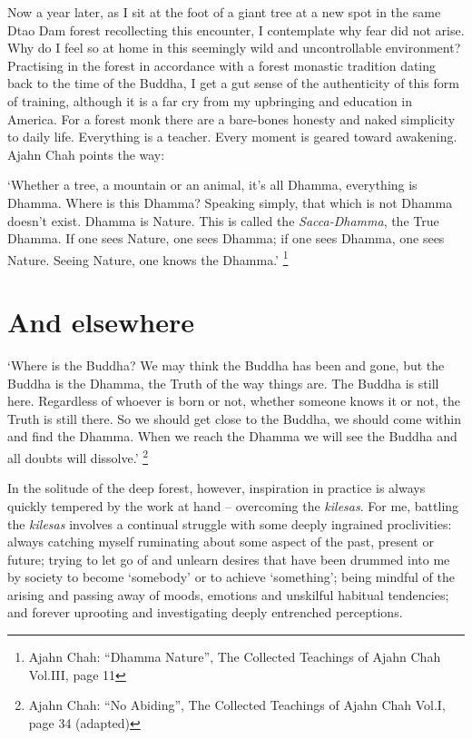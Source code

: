 Now a year later, as I sit at the foot of a giant tree at a new spot in
the same Dtao Dam forest recollecting this encounter, I contemplate why
fear did not arise. Why do I feel so at home in this seemingly wild and
uncontrollable environment? Practising in the forest in accordance with
a forest monastic tradition dating back to the time of the Buddha, I get
a gut sense of the authenticity of this form of training, although it is
a far cry from my upbringing and education in America. For a forest monk
there are a bare-bones honesty and naked simplicity to daily life. 
Everything is a teacher. Every moment is geared toward awakening. Ajahn
Chah points the way: 

`Whether a tree, a mountain or an animal, it's all Dhamma, everything is
Dhamma. Where is this Dhamma? Speaking simply, that which is not Dhamma
doesn't exist. Dhamma is Nature. This is called the \emph{Sacca-Dhamma}, 
the True Dhamma. If one sees Nature, one sees Dhamma; if one sees
Dhamma, one sees Nature. Seeing Nature, one knows the Dhamma.'%
\footnote{Ajahn Chah: ``Dhamma Nature'', The Collected Teachings of Ajahn Chah Vol.III, page 11}

\section{And elsewhere}

`Where is the Buddha? We may think the Buddha has been and gone, but the
Buddha is the Dhamma, the Truth of the way things are. The Buddha is
still here. Regardless of whoever is born or not, whether someone knows
it or not, the Truth is still there. So we should get close to the
Buddha, we should come within and find the Dhamma. When we reach the
Dhamma we will see the Buddha and all doubts will dissolve.'%
\footnote{Ajahn Chah: ``No Abiding'', The Collected Teachings of Ajahn Chah Vol.I, page 34 (adapted)}

In the solitude of the deep forest, however, inspiration in practice is
always quickly tempered by the work at hand -- overcoming the
\emph{kilesas}. For me, battling the \emph{kilesas} involves a continual
struggle with some deeply ingrained proclivities: always catching myself
ruminating about some aspect of the past, present or future; trying to
let go of and unlearn desires that have been drummed into me by society
to become `somebody' or to achieve `something'; being mindful of the
arising and passing away of moods, emotions and unskilful habitual
tendencies; and forever uprooting and investigating deeply entrenched
perceptions. 

